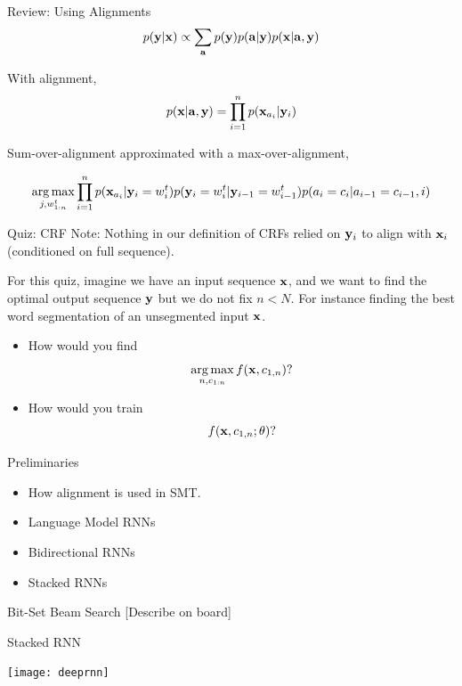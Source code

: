 \documentclass{beamer}
\begin{document}
\begin{frame}{Review: Using Alignments}
  \[ p(\mathbf{y} | \mathbf{x}) \propto \sum_{\mathbf{a}} p(\mathbf{y}) p(\mathbf{a} | \mathbf{y}) p(\mathbf{x} |  \mathbf{a}, \mathbf{y})  \]  

  With alignment,
  \[ p(\mathbf{x} |  \mathbf{a}, \mathbf{y})  = \prod_{i=1}^n p(\mathbf{x}_{a_i} | \mathbf{y}_i) \] 

  \air 

  Sum-over-alignment approximated with a max-over-alignment,

  \[ \argmax_{j, w^t_{1:n}} \prod_{i=1}^n p(\boldx_{a_i} | \boldy_i=w^t_i) p(\boldy_i=w^t_i | \boldy_{i-1}=w^t_{i-1}) p(a_i = c_i | a_{i-1}=c_{i-1}, i)   \]  
\end{frame}

\begin{frame}{Quiz: CRF}
  Note: Nothing in our definition of CRFs relied on $\mathbf{y}_i$ to align
  with $\mathbf{x}_i$ (conditioned on full sequence). 

  For this quiz, imagine we have an input sequence $\mathbf{x}$, and we want to 
  find the optimal output sequence $\mathbf{y}$ but we do not fix $n < N$. For instance 
  finding the best word segmentation of an unsegmented input $\mathbf{x}$. 

  \begin{itemize}
  \item How would you find \[ \argmax_{n, c_{1:n}} f(\boldx, c_{1,n}) ?\]

  \item How would you train \[ f(\mathbf{x}, c_{1,n}; \theta) ?\] 
  \end{itemize}
\end{frame}

\begin{frame}{Preliminaries}
  \begin{itemize}
  \item How alignment is used in SMT.
    \air

  \item Language Model RNNs 
  \item Bidirectional RNNs 
  \item Stacked RNNs 
  \end{itemize}
\end{frame}

\begin{frame}{Bit-Set Beam Search}
  [Describe on board] 
\end{frame}

\begin{frame}{Stacked RNN}
  \begin{center}
    \texttt{[image: deeprnn]}
  \end{center}
\end{frame}
\end{document}
